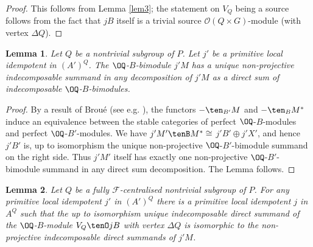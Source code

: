 \documentclass{amsart} %
\theoremstyle{plain}\newtheorem{Theorem}{Theorem}[section]
\theoremstyle{plain}\newtheorem{Conjecture}[Theorem]{Conjecture}
\theoremstyle{plain}\newtheorem{Corollary}[Theorem]{Corollary}
\theoremstyle{plain}\newtheorem{Lemma}[Theorem]{Lemma}
\theoremstyle{plain}\newtheorem{Proposition}[Theorem]{Proposition}
\theoremstyle{definition}\newtheorem{Definition}[Theorem]{Definition}
\theoremstyle{definition}\newtheorem{Example}[Theorem]{Example}
\theoremstyle{definition}\newtheorem{Examples}[Theorem]{Examples}
\theoremstyle{definition}\newtheorem{Remark}[Theorem]{Remark}
\theoremstyle{definition}\newtheorem{Remarks}[Theorem]{Remarks}
\theoremstyle{plain}\newtheorem{Statement}[Theorem]{}
\def\CF{{\mathcal{F}}}    \def\OS{{\mathcal{O}S}}
\def\CO{{\mathcal{O}}}
\begin{document}
\begin{proof}
This follows from  Lemma \ref{lem3}; the statement on $V_Q$ being
a source follows from the fact that $jB$ itself  is a
trivial source $\CO(Q\times G)$-module (with vertex $\Delta Q$).
\end{proof}


\begin{Lemma} \label{lem7}
Let $Q$ be a nontrivial subgroup of $P$. 
Let $j'$ be a primitive local idempotent in $(A')^Q$. 
The $\OQ$-$B$-bimodule $j'M$ has a unique non-projective indecomposable 
summand in any decomposition of $j'M$ as a direct sum
of indecomposable $\OQ$-$B$-bimodules. 
\end{Lemma}

\begin{proof}
By a result of Brou\'e (see e.g.  \cite[Proposition 2.17.11]{LiBookI}),
the functors $-\ten_{B'}M$ and $-\ten_B M^*$ induce an equivalence between
the stable categories of perfect $\OQ$-$B$-modules and perfect $\OQ$-$B'$-modules.
We have $j'M'\tenB M^*\cong$ $j'B'\oplus j'X'$,
and hence $j'B'$ is, up to isomorphism the unique non-projective
$\OQ$-$B'$-bimodule summand on the right side. Thus $j'M'$ itself has exactly one
non-projective $\OQ$-$B'$-bimodule summand in any direct sum decomposition.
The Lemma follows.
\end{proof}

\begin{Lemma} \label{lem75}
Let  $Q$ be a fully $\CF$-centralised nontrivial subgroup of $P$.
For any primitive local idempotent $j'$ in $(A')^Q$ there is a primitive local
idempotent $j$ in $A^Q$ such that  the up to isomorphism 
unique indecomposable direct summand of the $\OQ$-$B$-module 
$V_Q\tenO jB$ with vertex $\Delta Q$ is isomorphic to the non-projective 
indecomposable direct summands of $j'M$.
\end{Lemma}
\end{document}

